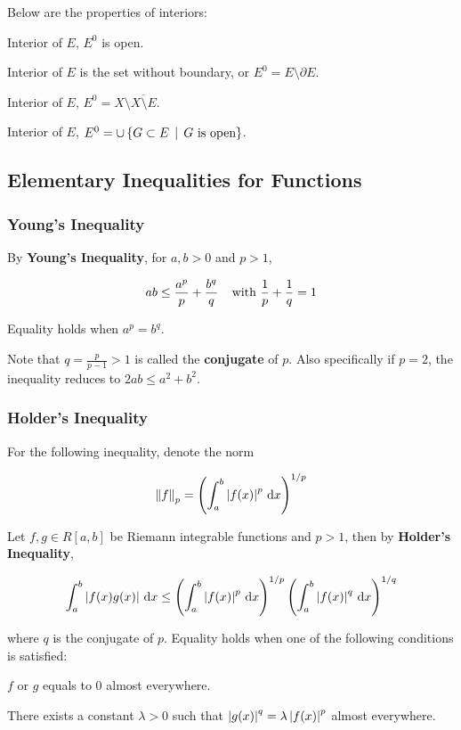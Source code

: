 \documentclass[a4paper,12pt]{article}
\begin{document}
\begin{pst}
  Below are the properties of interiors:

  \begin{alist}
    \item Interior of $E$, $E^{0}$ is open.
    \item Interior of $E$ is the set without boundary, or $E^{0}=E\setminus\partial E$.
    \item Interior of $E$, $E^{0}=X\setminus\overline{X\setminus E}$.
    \item Interior of $E$, $E^{0}=\cup\left\{ G\subset E\,\mid\, G\text{ is open}\right\}$.
  \end{alist}
\end{pst}

\subsection{Elementary Inequalities for Functions}
\subsubsection{Young's Inequality}
\begin{thm}
  By \textbf{Young's Inequality}, for $a,b>0$ and $p>1$,

  $$ab\leq\frac{a^{p}}{p}+\frac{b^{q}}{q}\;\;\;\;\text{with }\frac{1}{p}+\frac{1}{q}=1$$\s

  Equality holds when $a^{p}=b^{q}$.
\end{thm}\n

Note that $q=\frac{p}{p-1}>1$ is called the \textbf{conjugate} of $p$. Also specifically if $p=2$, the inequality reduces to $2ab\leq a^{2}+b^{2}$.

\subsubsection{Holder's Inequality}
For the following inequality, denote the norm

$$\left\| f\right\|_{p}=\left( \int_{a}^{b}\left| f(x)\right|^{p}\,\mathrm{d} x\right)^{1/p}$$\s

\begin{thm}
  Let $f,g\in R[a,b]$ be Riemann integrable functions and $p>1$, then by \textbf{Holder's Inequality},

  $$\int_{a}^{b}\left| f(x)g(x)\right|\,\mathrm{d} x\leq\left( \int_{a}^{b}\left| f(x)\right|^{p}\,\mathrm{d} x\right)^{1/p}\left( \int_{a}^{b}\left| f(x)\right|^{q}\,\mathrm{d} x\right)^{1/q}$$\s

  where $q$ is the conjugate of $p$. Equality holds when one of the following conditions is satisfied:

  \begin{alist}
    \item $f$ or $g$ equals to $0$ almost everywhere.
    \item There exists a constant $\lambda>0$ such that $\left| g(x)\right|^{q}=\lambda\left| f(x)\right|^{p}$ almost everywhere.
  \end{alist}
\end{thm}\n
\end{document}
